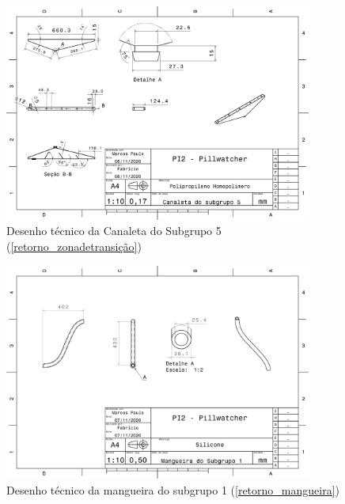 \begin{apendicesenv}
\begin{figure}[H]
    \centering
    \includegraphics[width=0.9\textwidth]{figuras/estrutura/Desenhos/Canaleta_S5.pdf}
    \caption{Desenho técnico da Canaleta do Subgrupo 5 (\ref{retorno_zonadetransição})}
    \label{fig:canaletaS5}
\end{figure}

\begin{figure}[H]
    \centering
    \includegraphics[width=0.9\textwidth]{figuras/estrutura/Desenhos/S1C1.pdf}
    \caption{Desenho técnico da mangueira do subgrupo 1 (\ref{retorno_mangueira})}
    \label{fig:M_S1}
\end{figure}


\end{apendicesenv}
